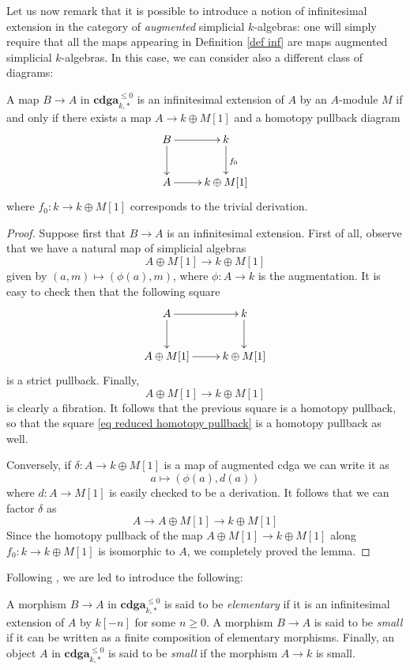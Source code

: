 \begin{refsection}
Let us now remark that it is possible to introduce a notion of infinitesimal extension in the category of \emph{augmented} simplicial $k$-algebras: one will simply require that all the maps appearing in Definition \ref{def inf} are maps augmented simplicial $k$-algebras. In this case, we can consider also a different class of diagrams:

\begin{lemma}
A map $B \to A$ in $\mathbf{cdga}_{k,*}^{\le 0}$ is an infinitesimal extension of $A$ by an $A$-module $M$ if and only if there exists a map $A \to k \oplus M[1]$ and a homotopy pullback diagram
\begin{equation} \label{eq reduced homotopy pullback}
\xymatrix{
B \ar[r] \ar[d] & k \ar[d]^{f_0} \\ A \ar[r] & k \oplus M[1]
}
\end{equation}
where $f_0 \colon k \to k \oplus M[1]$ corresponds to the trivial derivation.
\end{lemma}

\begin{proof}
Suppose first that $B \to A$ is an infinitesimal extension. First of all, observe that we have a natural map of simplicial algebras
\[
A \oplus M[1] \to k \oplus M[1]
\]
given by $(a,m) \mapsto (\phi(a),m)$, where $\phi \colon A \to k$ is the augmentation. It is easy to check then that the following square
\[
\xymatrix{
A \ar[d] \ar[r] & k \ar[d] \\ A \oplus M[1] \ar[r] & k \oplus M[1]
}
\]
is a strict pullback. Finally,
\[
A \oplus M[1] \to k \oplus M[1]
\]
is clearly a fibration. It follows that the previous square is a homotopy pullback, so that the square \eqref{eq reduced homotopy pullback} is a homotopy pullback as well.

Conversely, if $\delta \colon A \to k \oplus M[1]$ is a map of augmented cdga we can write it as
\[
a \mapsto (\phi(a), d(a))
\]
where $d \colon A \to M[1]$ is easily checked to be a derivation. It follows that we can factor $\delta$ as
\[
A \to A \oplus M[1] \to k \oplus M[1]
\]
Since the homotopy pullback of the map $A \oplus M[1] \to k \oplus M[1]$ along $f_0 \colon k \to k \oplus M[1]$ is isomorphic to $A$, we completely proved the lemma.
\end{proof}

Following \cite[Definition 1.1.5]{dagx}, we are led to introduce the following:

\begin{defin}
A morphism $B \to A$ in $\mathbf{cdga}_{k,*}^{\le 0}$ is said to be \emph{elementary} if it is an infinitesimal extension of $A$ by $k[-n]$ for some $n \ge 0$. A morphism $B \to A$ is said to be \emph{small} if it can be written as a finite composition of elementary morphisms. Finally, an object $A$ in $\mathbf{cdga}_{k,*}^{\le 0}$ is said to be \emph{small} if the morphism $A \to k$ is small.
\end{defin}


\end{refsection}
